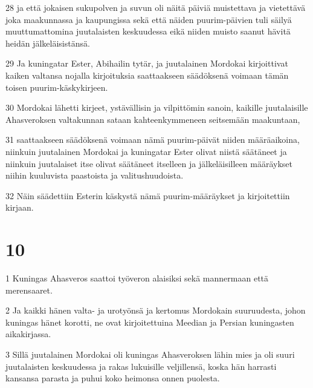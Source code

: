 \par 28 ja että jokaisen sukupolven ja suvun oli näitä päiviä muistettava ja vietettävä joka maakunnassa ja kaupungissa sekä että näiden puurim-päivien tuli säilyä muuttumattomina juutalaisten keskuudessa eikä niiden muisto saanut hävitä heidän jälkeläisistänsä.
\par 29 Ja kuningatar Ester, Abihailin tytär, ja juutalainen Mordokai kirjoittivat kaiken valtansa nojalla kirjoituksia saattaakseen säädöksenä voimaan tämän toisen puurim-käskykirjeen.
\par 30 Mordokai lähetti kirjeet, ystävällisin ja vilpittömin sanoin, kaikille juutalaisille Ahasveroksen valtakunnan sataan kahteenkymmeneen seitsemään maakuntaan,
\par 31 saattaakseen säädöksenä voimaan nämä puurim-päivät niiden määräaikoina, niinkuin juutalainen Mordokai ja kuningatar Ester olivat niistä säätäneet ja niinkuin juutalaiset itse olivat säätäneet itselleen ja jälkeläisilleen määräykset niihin kuuluvista paastoista ja valitushuudoista.
\par 32 Näin säädettiin Esterin käskystä nämä puurim-määräykset ja kirjoitettiin kirjaan.

\chapter{10}

\par 1 Kuningas Ahasveros saattoi työveron alaisiksi sekä mannermaan että merensaaret.
\par 2 Ja kaikki hänen valta- ja urotyönsä ja kertomus Mordokain suuruudesta, johon kuningas hänet korotti, ne ovat kirjoitettuina Meedian ja Persian kuningasten aikakirjassa.
\par 3 Sillä juutalainen Mordokai oli kuningas Ahasveroksen lähin mies ja oli suuri juutalaisten keskuudessa ja rakas lukuisille veljillensä, koska hän harrasti kansansa parasta ja puhui koko heimonsa onnen puolesta.


